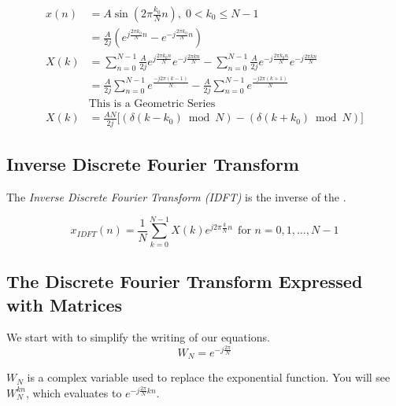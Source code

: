 \begin{equation}\label{eq:DFT_of_Sine}
  \begin{aligned}
    x(n) &= A \sin \left( 2\pi \frac{k_{0}}{N} n \right),\; 0 < k_{0} \leq N-1 \\
    &= \frac{A}{2j} \left( e^{j \frac{2\pi k_{0}}{N} n} - e^{-j \frac{2\pi k_{0}}{N} n} \right) \\
    X(k) &= \sum\limits_{n=0}^{N-1} \frac{A}{2j} e^{j \frac{2\pi k_{0} n}{N}} e^{-j \frac{2\pi k n}{N}} - \sum\limits_{n=0}^{N-1} \frac{A}{2j} e^{-j \frac{2\pi k_{0} n}{N}} e^{-j \frac{2\pi k n}{N}} \\
    &= \frac{A}{2j} \sum\limits_{n=0}^{N-1} e^{\frac{-j 2\pi (k-1)}{N}} - \frac{A}{2j} \sum\limits_{n=0}^{N-1} e^{\frac{-j 2\pi (k+1)}{N}} \\
    &\text{This is a Geometric Series} \\
    X(k) &= \frac{AN}{2j} \biggl[ (\delta(k-k_{0}) \bmod N) - (\delta(k+k_{0}) \bmod N) \biggr]
  \end{aligned}
\end{equation}

\subsection{Inverse Discrete Fourier Transform}\label{subsec:IDFT}
\begin{definition}\label{def:IDFT}
  The \emph{Inverse Discrete Fourier Transform (IDFT)} is the inverse of the .

  \begin{equation}\label{eq:IDFT}
    x_{IDFT}(n) = \frac{1}{N} \sum\limits_{k=0}^{N-1} X(k) e^{j 2\pi \frac{k}{N} n} \:\: \text{for } n = 0, 1, \ldots, N-1
  \end{equation}
\end{definition}

\subsection{The Discrete Fourier Transform Expressed with Matrices}\label{subsec:DFT_Matrix}
We start with  to simplify the writing of our equations.
\begin{equation}\label{eq:DFT_W_Variable}
  W_{N} = e^{-j \frac{2\pi}{N}}
\end{equation}

$W_{N}$ is a complex variable used to replace the exponential function.
You will see $W_{N}^{kn}$, which evaluates to $e^{-j \frac{2\pi}{N}kn}$.

